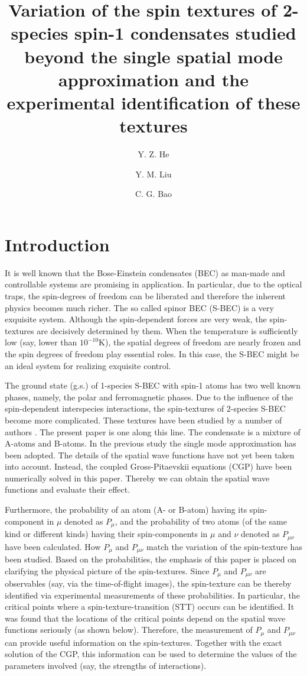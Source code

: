 \documentclass[10pt]{wlscirep}
\title{Variation of the spin textures of 2-species spin-1 condensates
studied beyond the single spatial mode approximation and the experimental
identification of these textures}
\author[1]{Y. Z. He}
\author[2]{Y. M. Liu}
\author[1,*]{C. G. Bao}
\affil[1]{School of Physics, Sun Yat-Sen University, Guangzhou, 510275, P. R. China}
\affil[2]{Department of physics, Shaoguan University, shaoguan, 510205, P. R. China}
\affil[*]{Corresponding author: C.G. Bao, stsbcg@mail.sysu.edu.cn}
\begin{document}
\flushbottom
\maketitle



\section*{Introduction}

It is well known that the Bose-Einstein condensates (BEC) as man-made and
controllable systems are promising in application. In particular, due to the
optical traps, the spin-degrees of freedom can be liberated and therefore
the inherent physics becomes much richer\cite{ref5,ref6,ref7,ref8,ref9,ref10}.
The so called spinor BEC (S-BEC) is a very exquisite system. Although the
spin-dependent forces are very weak, the spin-textures are decisively
determined by them. When the temperature is sufficiently low (say, lower
than $10^{-10}$K), the spatial degrees of freedom
are nearly frozen and the spin degrees of freedom play essential roles. In
this case, the S-BEC might be an ideal system for realizing exquisite
control.

The ground state (g.s.) of 1-species S-BEC with spin-1 atoms has two well
known phases, namely, the polar and ferromagnetic phases. Due to the
influence of the spin-dependent interspecies interactions, the spin-textures
of 2-species S-BEC become more complicated. These textures have been studied
by a number of authors \cite{ml,ref11,ref12,ref13,ref14,ref15,ref16,ref17,ref18}.
The present paper is
one along this line. The condensate is a mixture of A-atoms and B-atoms. In
the previous study the single mode approximation has been adopted. The
details of the spatial wave functions have not yet been taken into account.
Instead, the coupled Gross-Pitaevskii equations (CGP) have been numerically
solved in this paper. Thereby we can obtain the spatial wave functions and
evaluate their effect.

Furthermore, the probability of an atom (A- or B-atom) having its
spin-component in $\mu$ denoted as $P_{\mu}$, and the probability of two
atoms (of the same kind or different kinds) having their spin-components in
$\mu$ and $\nu$ denoted as $P_{\mu\nu}$ have been calculated. How $P_{\mu}$
and $P_{\mu\nu}$ match the variation of the spin-texture has been
studied. Based on the probabilities, the emphasis of this paper is placed on
clarifying the physical picture of the spin-textures. Since $P_{\mu}$ and
$P_{\mu\nu}$ are observables (say, via the time-of-flight images), the
spin-texture can be thereby identified via experimental measurements of
these probabilities. In particular, the critical points where a
spin-texture-transition (STT) occurs can be identified. It was found that
the locations of the critical points depend on the spatial wave functions
seriously (as shown below). Therefore, the measurement of $P_{\mu}$ and 
$P_{\mu\nu}$ can provide useful information on the spin-textures. Together
with the exact solution of the CGP, this information can be used to
determine the values of the parameters involved (say, the strengths of
interactions).
\end{document}
